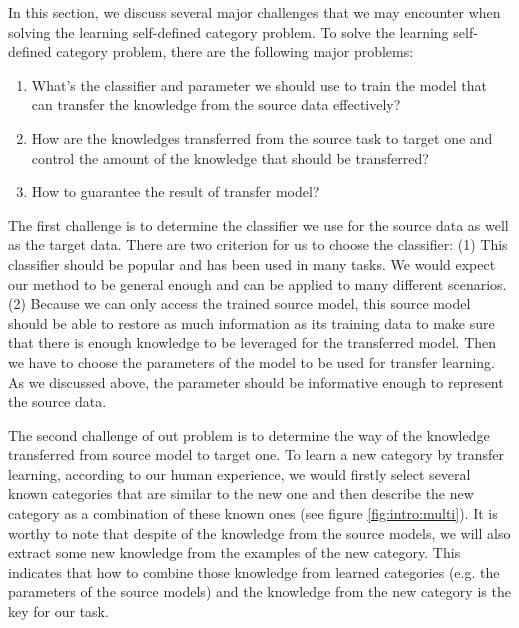 In this section, we discuss several major challenges that we may encounter when solving the learning self-defined category problem.
To solve the learning self-defined category problem, there are the following major problems:
\begin{enumerate}
	\item What's the classifier and parameter we should use to train the model that can transfer the knowledge from the source data effectively?
	\item How are the knowledges transferred from the source task to target one and control the amount of the knowledge that should be transferred? 
	\item How to guarantee the result of transfer model? 
\end{enumerate}

The first challenge is to determine the classifier we use for the source data as well as the target data. There are two criterion for us to choose the classifier: (1) This classifier should be popular and has been used in many tasks. We would expect our method to be general enough and can be applied to many different scenarios. (2) Because we can only access the trained source model, this source model should be able to restore as much information as its training data to make sure that there is enough knowledge to be leveraged for the transferred model.  
Then we have to choose the parameters of the model to be used for transfer learning. As we discussed above, the parameter should be informative enough to represent the source data. 

The second challenge of out problem is to determine the way of the knowledge transferred from source model to target one. To learn a new category by transfer learning, according to our human experience, we would firstly select several known categories that are similar to the new one and then describe the new category as a combination of these known ones (see figure \ref{fig:intro:multi}). It is worthy to note that despite of the knowledge from the source models, we will also extract some new knowledge from the examples of the new category. This indicates that how to combine those knowledge from learned categories (e.g. the parameters of the source models) and the knowledge from the new category is the key for our task. 

